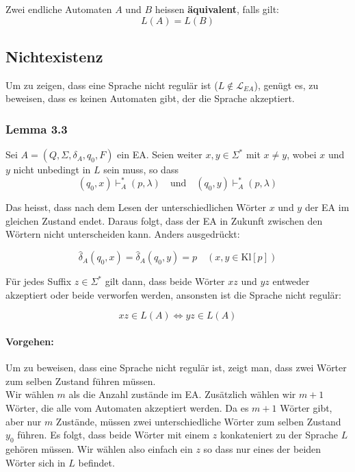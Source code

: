 \documentclass[11pt]{article}
\begin{document}
Zwei endliche Automaten $A$ und $B$ heissen \textbf{{\"a}quivalent}, falls gilt:
\begin{equation*}
	L(A) = L(B)
\end{equation*}

\subsection{Nichtexistenz}

Um zu zeigen, dass eine Sprache nicht regul{\"a}r ist ($L \notin \mathcal{L}_{EA}$), gen{\"u}gt es, zu beweisen, dass es keinen Automaten gibt, der die Sprache akzeptiert.

\subsubsection{Lemma 3.3}

Sei $A = (Q, \Sigma, \delta_A, q_0, F)$ ein EA. Seien weiter $x,y \in \Sigma^*$ mit $x \neq y$, wobei $x$ und $y$ nicht unbedingt in $L$ sein muss, so dass
\begin{equation*}
	(q_0, x) \vdash_A^* (p, \lambda)\quad\text{und}\quad (q_0, y) \vdash_A^* (p, \lambda)
\end{equation*}

Das heisst, dass nach dem Lesen der unterschiedlichen W{\"o}rter $x$ und $y$ der EA im gleichen Zustand endet. Daraus folgt, dass der EA in Zukunft zwischen den W{\"o}rtern nicht unterscheiden kann. Anders ausgedr{\"u}ckt:

\begin{equation*}
	\hat\delta_A(q_0, x) = \hat\delta_A(q_0, y) = p \quad (x, y \in \text{Kl}[p])
\end{equation*}

F{\"u}r jedes Suffix $z \in \Sigma^*$ gilt dann, dass beide W{\"o}rter $xz$ und $yz$ entweder akzeptiert oder beide verworfen werden, ansonsten ist die Sprache nicht regul{\"a}r:

\begin{equation*}
	xz \in L(A) \Leftrightarrow yz \in L(A)
\end{equation*}

\paragraph{Vorgehen:} Um zu beweisen, dass eine Sprache nicht regul{\"a}r ist, zeigt man, dass zwei W{\"o}rter zum selben Zustand f{\"u}hren m{\"u}ssen. \\
Wir w{\"a}hlen $m$ als die Anzahl zust{\"a}nde im EA. Zus{\"a}tzlich w{\"a}hlen wir $m+1$ W{\"o}rter, die alle vom Automaten akzeptiert werden. Da es $m+1$ W{\"o}rter gibt, aber nur $m$ Zust{\"a}nde, m{\"u}ssen zwei unterschiedliche W{\"o}rter zum selben Zustand $y_0$ f{\"u}hren. Es folgt, dass beide W{\"o}rter mit einem $z$ konkateniert zu der Sprache $L$ geh{\"o}ren m{\"u}ssen. Wir w{\"a}hlen also einfach ein $z$ so dass nur eines der beiden W{\"o}rter sich in $L$ befindet.
\end{document}
